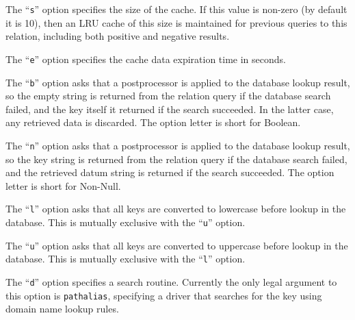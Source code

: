 The ``{\tt s}'' option specifies the size of the cache.  If this value 
is non-zero (by default it is 10), then an LRU cache of this size is 
maintained for previous queries to this relation, including both positive 
and negative results.

The ``{\tt e}'' option specifies the cache data expiration time in seconds.

The ``{\tt b}'' option asks that a postprocessor is applied to the database 
lookup result, so the empty string is returned from the relation query if the
database search failed, and the key itself it returned if the search
succeeded.  In the latter case, any retrieved data is discarded.  The
option letter is short for Boolean.

The ``{\tt n}'' option asks that a postprocessor is applied to the database 
lookup result, so the key string is returned from the relation query if the
database search failed, and the retrieved datum string is returned if the
search succeeded.  The option letter is short for Non-Null.

The ``{\tt l}'' option asks that all keys are converted to lowercase before 
lookup in the database.  This is mutually exclusive with the ``{\tt u}'' 
option.

The ``{\tt u}'' option asks that all keys are converted to uppercase before 
lookup in the database.  This is mutually exclusive with the ``{\tt l}'' 
option.

The ``{\tt d}'' option specifies a search routine.  Currently the only legal
argument to this option is {\tt pathalias}, specifying a driver that searches
for the key using domain name lookup rules.



